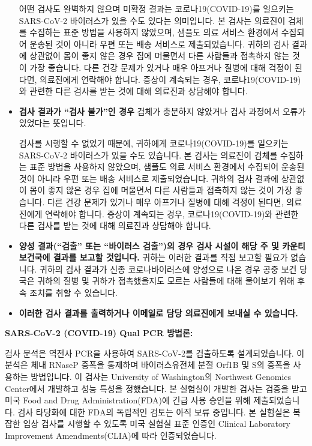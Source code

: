 \documentclass[10pt]{article}
\begin{document}
\begin{itemize}
어떤 검사도 완벽하지 않으며 미확정 결과는 코로나19(COVID-19)를 일으키는 SARS-CoV-2 바이러스가
있을 수도 있다는 의미입니다.  본 검사는 의료진이 검체를 수집하는 표준 방법을 사용하지 않았으며,
샘플도 의료 서비스 환경에서 수집되어 운송된 것이 아니라 우편 또는 배송 서비스로 제출되었습니다.
귀하의 검사 결과에 상관없이 몸이 좋지 않은 경우 집에 머물면서 다른 사람들과 접촉하지 않는 것이 가장
좋습니다. 다른 건강 문제가 있거나 매우 아프거나 질병에 대해 걱정이 된다면, 의료진에게 연락해야
합니다.  증상이 계속되는 경우, 코로나19(COVID-19)와 관련한 다른 검사를 받는 것에 대해 의료진과
상담해야 합니다.

\item

  \textbf{검사 결과가 ``검사 불가''인 경우} 검체가 충분하지 않았거나 검사 과정에서 오류가
  있었다는 뜻입니다.

  검사를 시행할 수 없었기 때문에, 귀하에게 코로나19(COVID-19)를 일으키는 SARS-CoV-2 바이러스가
  있을 수도 있습니다.  본 검사는 의료진이 검체를 수집하는 표준 방법을 사용하지 않았으며, 샘플도
  의료 서비스 환경에서 수집되어 운송된 것이 아니라 우편 또는 배송 서비스로 제출되었습니다.  귀하의
  검사 결과에 상관없이 몸이 좋지 않은 경우 집에 머물면서 다른 사람들과 접촉하지 않는 것이 가장
  좋습니다. 다른 건강 문제가 있거나 매우 아프거나 질병에 대해 걱정이 된다면, 의료진에게 연락해야
  합니다.  증상이 계속되는 경우, 코로나19(COVID-19)와 관련한 다른 검사를 받는 것에 대해 의료진과
  상담해야 합니다.

\item

  \textbf{양성 결과(``검출'' 또는 ``바이러스 검출'')의 경우 검사 시설이 해당 주 및 카운티
  보건국에 결과를 보고할 것입니다.} 귀하는 이러한 결과를 직접 보고할 필요가 없습니다.  귀하의 검사
  결과가 신종 코로나바이러스에 양성으로 나온 경우 공중 보건 당국은 귀하의 질병 및 귀하가
  접촉했을지도 모르는 사람들에 대해 물어보기 위해 후속 조치를 취할 수 있습니다.

\item

  \textbf{이러한 검사 결과를 출력하거나 이메일로 담당 의료진에게 보내실 수 있습니다.}

\end{itemize}

\bigskip
\textbf{SARS-CoV-2 (COVID-19) Qual PCR 방법론:}

검사 분석은 역전사 PCR을 사용하여 SARS-CoV-2를 검출하도록 설계되었습니다. 이 분석은 체내 RNaseP
증폭을 통제하며 바이러스유전체 분절 Orf1B 및 S의 증폭을 사용하는 방법입니다.  이 검사는
University of Washington의 Northwest Genomics Center에서 개발하고 성능 특성을
정했습니다.  본 실험실이 개발한 검사는 검증을 받고 미국 Food and Drug Administration(FDA)에
긴급 사용 승인을 위해 제출되었습니다. 검사 타당화에 대한 FDA의 독립적인 검토는 아직 보류 중입니다.
본 실험실은 복잡한 임상 검사를 시행할 수 있도록 미국 실험실 표준 인증인 Clinical Laboratory
Improvement Amendments(CLIA)에 따라 인증되었습니다.
\end{document}
